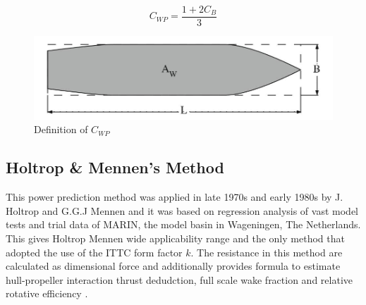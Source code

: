 \begin{equation}
    \label{eqn:cwp_Schneekluth}
    C_{WP} = \frac{1+2C_B}{3}
\end{equation}

\begin{figure}[ht]
    \centering
        \includegraphics[width=.5\textwidth]{02_figures/biran14_cwp.jpg}
        \caption{Definition of $C_{WP}$ }
        \label{fig:biran_cwp}
\end{figure}

\subsection{Holtrop \& Mennen's Method}\label{sec:foc_calc}

This power prediction method was applied in late 1970s and early 1980s by J. Holtrop and G.G.J Mennen and it was based on regression analysis of vast model tests and trial data of MARIN, the model basin in Wageningen, The Netherlands. This gives Holtrop Mennen wide applicability range and the only method that adopted the use of the ITTC form factor $k$. The resistance in this method are calculated as dimensional force and additionally provides formula to estimate hull-propeller interaction thrust dedudction, full scale wake fraction and relative rotative efficiency . 

